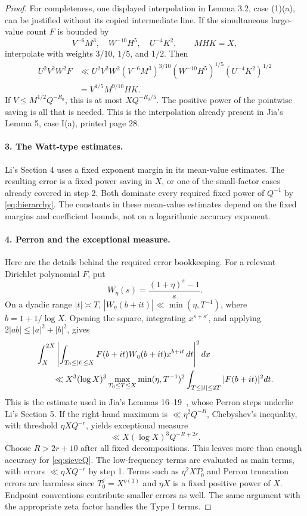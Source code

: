 \documentclass[11pt,a4paper]{article}
\theoremstyle{remark}
\begin{document}
\begin{proof}
For completeness, one displayed interpolation in Lemma 3.2,
case (1)(a), can be justified without its copied intermediate line.
If the simultaneous large-value count $F$ is bounded by
\[
 V^{-6}M^3,\quad W^{-10}H^5,\quad U^{-4}K^2,
 \qquad MHK=X,
\]
interpolate with weights $3/10$, $1/5$, and $1/2$. Then
\begin{align*}
 U^2V^2W^2F
 &\ll U^2V^2W^2
     (V^{-6}M^3)^{3/10}
     (W^{-10}H^5)^{1/5}(U^{-4}K^2)^{1/2}\\
 &=V^{1/5}M^{9/10}HK.
\end{align*}
If $V\le M^{1/2}Q^{-R_0}$, this is at most
$XQ^{-R_0/5}$. The positive power of the pointwise saving is all that
is needed. This is the interpolation already present in Jia's
Lemma 5, case I(a), printed page 28.

\paragraph{3. The Watt-type estimates.}
Li's Section 4 uses a fixed exponent margin in its mean-value
estimates. The resulting error is a fixed power saving in $X$,
or one of the small-factor cases already covered in step 2.
Both dominate every required fixed power of $Q^{-1}$ by
\eqref{eq:hierarchy}. The constants in these mean-value estimates
depend on the fixed margins and coefficient bounds, not on a
logarithmic accuracy exponent.

\paragraph{4. Perron and the exceptional measure.}
Here are the details behind the required error bookkeeping.
For a relevant Dirichlet polynomial $F$, put
\[
                W_\eta(s)=\frac{(1+\eta)^s-1}{s}.
\]
On a dyadic range $|t|\asymp T$,
$|W_\eta(b+it)|\ll\min(\eta,T^{-1})$, where $b=1+1/\log X$.
Opening the square, integrating $x^{s+\overline{s'}}$, and applying
$2|ab|\le |a|^2+|b|^2$, gives
\begin{align}
 &\int_X^{2X}\left|
     \int_{T_0\le |t|\le X}F(b+it)W_\eta(b+it)x^{b+it}\,dt
                       \right|^2dx \nonumber\\
 &\hspace{7mm}\ll X^3(\log X)^3
       \max_{T_0\le T\le X}
       \min(\eta,T^{-1})^2
          \int_{T\le |t|\le2T}|F(b+it)|^2dt. \label{eq:perronL2}
\end{align}
This is the estimate used in Jia's Lemmas 16--19~\cite{Jia}, whose
Perron steps underlie Li's Section 5.
If the right-hand maximum is $\ll\eta^2Q^{-R}$, Chebyshev's inequality,
with threshold $\eta XQ^{-r}$, yields exceptional measure
\[
                       \ll X(\log X)^3Q^{-R+2r}.
\]
Choose $R>2r+10$ after all fixed decompositions. This leaves more
than enough accuracy for \eqref{eq:sieveQ}.
The low-frequency terms are evaluated as main terms, with errors
$\ll\eta XQ^{-r}$ by step 1.
Terms such as $\eta^2XT_0^j$ and Perron truncation errors are harmless
since $T_0^j=X^{o(1)}$ and $\eta X$ is a fixed positive power of $X$.
Endpoint conventions contribute smaller errors as well.
The same argument with the appropriate zeta factor handles the
Type I terms.


\end{proof}
\end{document}

